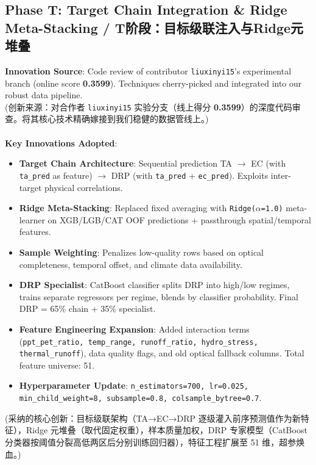 \subsection{Phase T: Target Chain Integration \& Ridge Meta-Stacking / T阶段：目标级联注入与Ridge元堆叠}
\begin{infobox}
\textbf{Innovation Source}: Code review of contributor \texttt{liuxinyi15}'s experimental branch (online score \textbf{0.3599}). Techniques cherry-picked and integrated into our robust data pipeline. \\
(创新来源：对合作者 \texttt{liuxinyi15} 实验分支（线上得分 \textbf{0.3599}）的深度代码审查。将其核心技术精确嫁接到我们稳健的数据管线上。) \\\\
\textbf{Key Innovations Adopted}:
\begin{itemize}
    \item \textbf{Target Chain Architecture}: Sequential prediction TA $\rightarrow$ EC (with \texttt{ta\_pred} as feature) $\rightarrow$ DRP (with \texttt{ta\_pred} + \texttt{ec\_pred}). Exploits inter-target physical correlations.
    \item \textbf{Ridge Meta-Stacking}: Replaced fixed averaging with \texttt{Ridge($\alpha$=1.0)} meta-learner on XGB/LGB/CAT OOF predictions + passthrough spatial/temporal features.
    \item \textbf{Sample Weighting}: Penalizes low-quality rows based on optical completeness, temporal offset, and climate data availability.
    \item \textbf{DRP Specialist}: CatBoost classifier splits DRP into high/low regimes, trains separate regressors per regime, blends by classifier probability. Final DRP = 65\% chain + 35\% specialist.
    \item \textbf{Feature Engineering Expansion}: Added interaction terms (\texttt{ppt\_pet\_ratio, temp\_range, runoff\_ratio, hydro\_stress, thermal\_runoff}), data quality flags, and old optical fallback columns. Total feature universe: 51.
    \item \textbf{Hyperparameter Update}: \texttt{n\_estimators=700, lr=0.025, min\_child\_weight=8, subsample=0.8, colsample\_bytree=0.7}.
\end{itemize}
(采纳的核心创新：目标级联架构（TA→EC→DRP 逐级灌入前序预测值作为新特征），Ridge 元堆叠（取代固定权重），样本质量加权，DRP 专家模型（CatBoost 分类器按阈值分裂高低两区后分别训练回归器），特征工程扩展至 51 维，超参焕血。) \\\\

\end{infobox}
